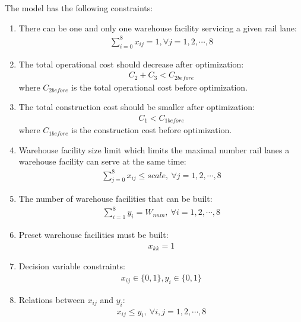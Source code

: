 The model has the following constraints:
\begin{enumerate}
	\item There can be one and only one warehouse facility servicing a given rail lane: 
	\begin{align}
		\sum_{i = 0}^8 x_{ij} = 1, \forall j = 1, 2, \cdots, 8
	\end{align}
	\item The total operational cost should decrease after optimization:
	\begin{align}
		C_2 + C_3 < C_{2before}
	\end{align}
	where $C_{2before}$ is the total operational cost before optimization.
	\item The total construction cost should be smaller after optimization:
	\begin{align}
		C_1 < C_{1before}
	\end{align}
	where $C_{1before}$ is the construction cost before optimization.
	\item Warehouse facility size limit which limits the maximal number rail lanes a warehouse facility can serve at the same time:
	\begin{align}
		\sum_{j = 0}^8 x_{ij} \leq scale, \ \forall j = 1, 2, \cdots, 8
	\end{align}
	\item The number of warehouse facilities that can be built:
	\begin{align}
		\sum_{i = 1}^8 y_i = W_{num}, \ \forall i = 1, 2, \cdots, 8
	\end{align}
	\item Preset warehouse facilities must be built:
	\begin{align}
		x_{kk} = 1
	\end{align}
	\item Decision variable constraints:
	\begin{align}
		x_{ij} \in \{0, 1\}, y_i \in \{0, 1\}
	\end{align}
	\item Relations between $x_{ij}$ and $y_i$:
	\begin{align}
		x_{ij} \leq y_i, \ \forall i,j = 1, 2, \cdots, 8
	\end{align}
\end{enumerate}

